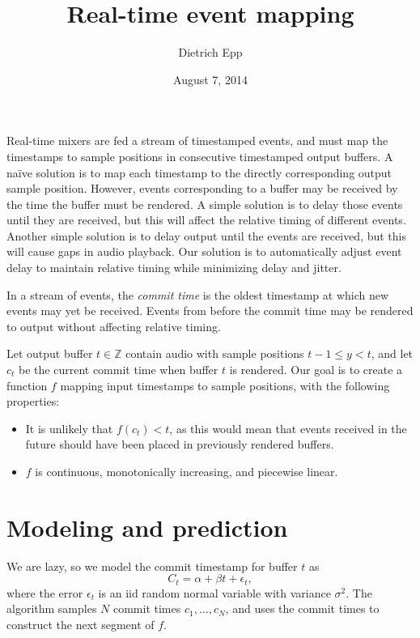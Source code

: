 \documentclass[12pt,letterpaper]{article}
\title{Real-time event mapping}
\author{Dietrich Epp}
\date{August 7, 2014}
\begin{document}
\maketitle

Real-time mixers are fed a stream of timestamped events, and must map the timestamps to sample positions in consecutive timestamped output buffers.
A naïve solution is to map each timestamp to the directly corresponding output sample position.
However, events corresponding to a buffer may be received by the time the buffer must be rendered.
A simple solution is to delay those events until they are received, but this will affect the relative timing of different events.
Another simple solution is to delay output until the events are received, but this will cause gaps in audio playback.
Our solution is to automatically adjust event delay to maintain relative timing while minimizing delay and jitter.

In a stream of events, the \textit{commit time} is the oldest timestamp at which new events may yet be received.
Events from before the commit time may be rendered to output without affecting relative timing.

Let output buffer $t \in \mathbb{Z}$ contain audio with sample positions $t - 1\le y < t$, and let $c_t$ be the current commit time when buffer $t$ is rendered.
Our goal is to create a function $f$ mapping input timestamps to sample positions, with the following properties:
\begin{itemize}
\item It is unlikely that $f(c_t) < t$, as this would mean that events received in the future should have been placed in previously rendered buffers.
\item $f$ is continuous, monotonically increasing, and piecewise linear.
\end{itemize}

\section*{Modeling and prediction}

We are lazy, so we model the commit timestamp for buffer $t$ as
\begin{equation*}
  C_t = \alpha + \beta t + \epsilon_t,
\end{equation*}
where the error $\epsilon_t$ is an iid random normal variable with variance $\sigma^2$.
The algorithm samples $N$ commit times $c_1,\dotsc,c_N$, and uses the commit times to construct the next segment of $f$.
\end{document}
